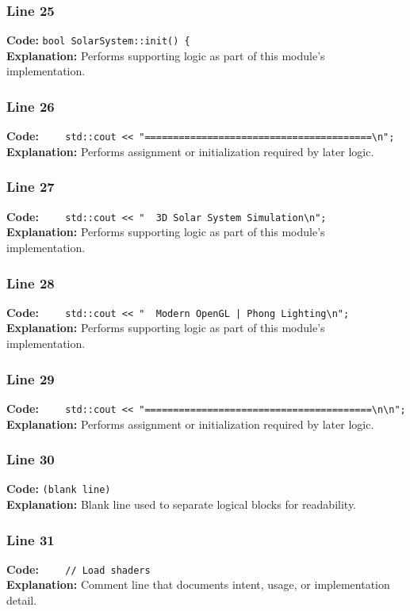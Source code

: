 \documentclass[11pt,a4paper]{article}
\begin{document}
\subsubsection*{Line 25}
\textbf{Code:} \verb|bool SolarSystem::init() {|\\
\textbf{Explanation:} Performs supporting logic as part of this module's implementation.

\subsubsection*{Line 26}
\textbf{Code:} \verb|    std::cout << "========================================\n";|\\
\textbf{Explanation:} Performs assignment or initialization required by later logic.

\subsubsection*{Line 27}
\textbf{Code:} \verb|    std::cout << "  3D Solar System Simulation\n";|\\
\textbf{Explanation:} Performs supporting logic as part of this module's implementation.

\subsubsection*{Line 28}
\textbf{Code:} \verb!    std::cout << "  Modern OpenGL | Phong Lighting\n";!\\
\textbf{Explanation:} Performs supporting logic as part of this module's implementation.

\subsubsection*{Line 29}
\textbf{Code:} \verb|    std::cout << "========================================\n\n";|\\
\textbf{Explanation:} Performs assignment or initialization required by later logic.

\subsubsection*{Line 30}
\textbf{Code:} \texttt{(blank line)}\\
\textbf{Explanation:} Blank line used to separate logical blocks for readability.

\subsubsection*{Line 31}
\textbf{Code:} \verb|    // Load shaders|\\
\textbf{Explanation:} Comment line that documents intent, usage, or implementation detail.
\end{document}

